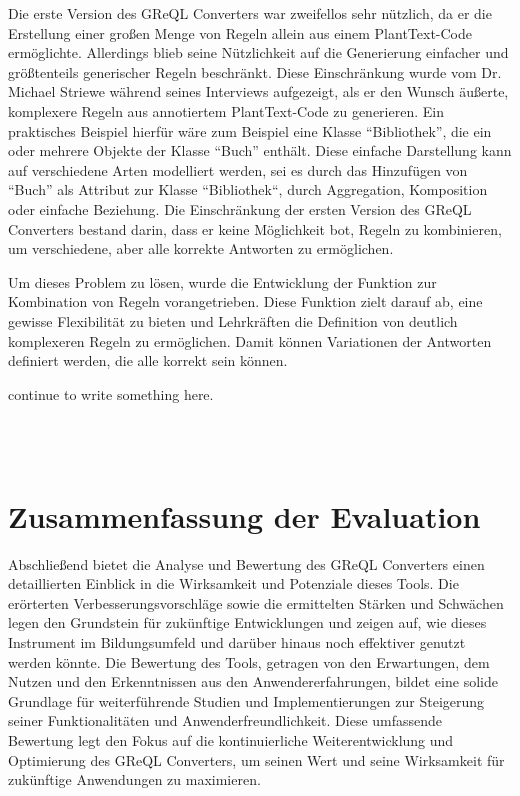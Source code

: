Die erste Version des GReQL Converters war zweifellos sehr nützlich, da er die Erstellung einer großen Menge von Regeln
allein aus einem PlantText-Code ermöglichte. Allerdings blieb seine Nützlichkeit auf die Generierung einfacher und
größtenteils generischer Regeln beschränkt. Diese Einschränkung wurde vom Dr. Michael Striewe während seines Interviews
aufgezeigt, als er den Wunsch äußerte, komplexere Regeln aus annotiertem PlantText-Code zu generieren. Ein praktisches
Beispiel hierfür wäre zum Beispiel eine Klasse ``Bibliothek'', die ein oder mehrere Objekte der Klasse ``Buch'' enthält.
Diese einfache Darstellung kann auf verschiedene Arten modelliert werden, sei es durch das Hinzufügen von ``Buch'' als
Attribut zur Klasse ``Bibliothek``, durch Aggregation, Komposition oder einfache Beziehung. Die Einschränkung der ersten
Version des GReQL Converters bestand darin, dass er keine Möglichkeit bot, Regeln zu kombinieren, um verschiedene, aber
alle korrekte Antworten zu ermöglichen.

Um dieses Problem zu lösen, wurde die Entwicklung der Funktion zur Kombination von Regeln vorangetrieben. Diese Funktion
zielt darauf ab, eine gewisse Flexibilität zu bieten und Lehrkräften die Definition von deutlich komplexeren Regeln zu
ermöglichen. Damit können Variationen der Antworten definiert werden, die alle korrekt sein können.

continue to write something here.

\\~\\


\section{Zusammenfassung der Evaluation}

Abschließend bietet die Analyse und Bewertung des GReQL Converters einen detaillierten Einblick in die Wirksamkeit und
Potenziale dieses Tools. Die erörterten Verbesserungsvorschläge sowie die ermittelten Stärken und Schwächen legen den
Grundstein für zukünftige Entwicklungen und zeigen auf, wie dieses Instrument im Bildungsumfeld und darüber hinaus noch
effektiver genutzt werden könnte. Die Bewertung des Tools, getragen von den Erwartungen, dem Nutzen und den
Erkenntnissen aus den Anwendererfahrungen, bildet eine solide Grundlage für weiterführende Studien und Implementierungen
zur Steigerung seiner Funktionalitäten und Anwenderfreundlichkeit. Diese umfassende Bewertung legt den Fokus auf die
kontinuierliche Weiterentwicklung und Optimierung des GReQL Converters, um seinen Wert und seine Wirksamkeit für
zukünftige Anwendungen zu maximieren.
